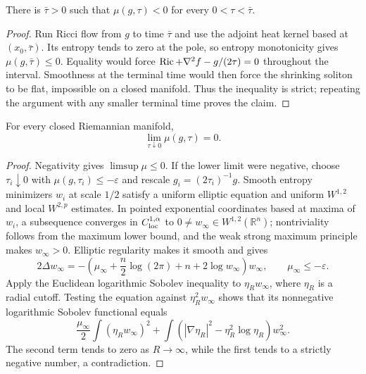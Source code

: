 \begin{lemma}
\label{lem:chow-iii-ch17-mu-negative-small-scale}


There is $\bar\tau>0$ such that $\mu(g,\tau)<0$ for every
$0<\tau<\bar\tau$.
\end{lemma}
\begin{proof}
\sketch Run Ricci flow from $g$ to time $\bar\tau$ and use the adjoint heat kernel
based at $(x_0,\bar\tau)$.  Its entropy tends to zero at the pole, so entropy
monotonicity gives $\mu(g,\bar\tau)\le0$.  Equality would force
$\operatorname{Ric}+\nabla^2f-g/(2\tau)=0$ throughout the interval.  Smoothness at the
terminal time would then force the shrinking soliton to be flat, impossible
on a closed manifold.  Thus the inequality is strict; repeating the argument
with any smaller terminal time proves the claim.
\end{proof}

\begin{proposition}
\label{prop:chow-iii-ch17-mu-small-scale-limit}


For every closed Riemannian manifold,
\[
 \lim_{\tau\downarrow0}\mu(g,\tau)=0.
\]
\end{proposition}
\begin{proof}
\sketch Negativity gives $\limsup\mu\le0$.  If the lower limit were negative, choose
$\tau_i\downarrow0$ with $\mu(g,\tau_i)\le-\varepsilon$ and rescale
$g_i=(2\tau_i)^{-1}g$.  Smooth entropy minimizers $w_i$ at scale $1/2$
satisfy a uniform elliptic equation and uniform $W^{1,2}$ and local
$W^{2,p}$ estimates.  In pointed exponential coordinates based at maxima of
$w_i$, a subsequence converges in $C^{1,\alpha}_{\rm loc}$ to
$0\ne w_\infty\in W^{1,2}(\mathbb R^n)$; nontriviality follows from the
maximum lower bound, and the weak strong maximum principle makes
$w_\infty>0$.  Elliptic regularity makes it smooth and gives
\[
 2\Delta w_\infty=-\left(\mu_\infty+\frac n2\log(2\pi)+n
 +2\log w_\infty\right)w_\infty,
 \qquad \mu_\infty\le-\varepsilon.
\]
Apply the Euclidean logarithmic Sobolev inequality to
$\eta_Rw_\infty$, where $\eta_R$ is a radial cutoff.  Testing the equation
against $\eta_R^2w_\infty$ shows that its nonnegative logarithmic Sobolev
functional equals
\[
 \frac{\mu_\infty}{2}\int(\eta_Rw_\infty)^2
 +\int(|\nabla\eta_R|^2-\eta_R^2\log\eta_R)w_\infty^2.
\]
The second term tends to zero as $R\to\infty$, while the first tends to a
strictly negative number, a contradiction.
\end{proof}

